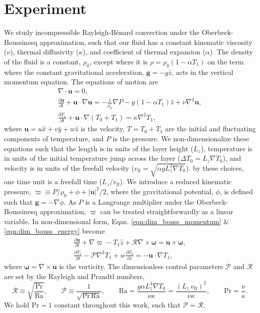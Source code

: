 \documentclass[aps, pre, onecolumn, nofootinbib, notitlepage, groupedaddress, amsfonts, amssymb, amsmath, longbibliography]{revtex4-1}
\newcommand{\DivU}{\ensuremath{\nabla\cdot\bm{u}}}
\newcommand{\grad}{\ensuremath{\nabla}}
\newcommand{\RB}{Rayleigh-B\'{e}nard }
\begin{document}
\section{Experiment}
\label{sec:experiment}
We study incompressible \RB convection under the Oberbeck-Boussinesq approximation,
such that our fluid
has a constant kinematic viscosity ($\nu$), thermal diffusivity ($\kappa$), and coefficient
of thermal expansion ($\alpha$). The density of the fluid is a constant, $\rho_0$,
except where it is $\rho = \rho_0(1  - \alpha T_1)$ on the term where
the constant gravitational acceleration, $\bm{g} = - g\hat{z}$, 
acts in the vertical momentum equation.
The equations of motion are \cite{spiegel&veronis1960}
\begin{gather}
\DivU = 0, 
	\label{eqn:incompressible}
\\
\frac{\partial \bm{u}}{\partial t} + \bm{u}\cdot\grad\bm{u} =
-\frac{1}{\rho_0}\grad P - g( 1 - \alpha T_1)\hat{z} + \nu\grad^2\bm{u}, 
	\label{eqn:dim_bouss_momentum}
\\
\frac{\partial T_1}{\partial t} + \bm{u}\cdot\grad(T_0 + T_1) = \kappa\grad^2 T_1,
	\label{eqn:dim_bouss_energy}
\end{gather}
where $\bm{u} = u\hat{x} + v\hat{y} + w\hat{z}$ is the velocity, 
$T = T_0 + T_1$ are the initial and fluctuating components of temperature, 
and $P$ is the pressure.
We non-dimensionalize these equations such that the
length is in units of the layer height ($L_z$),
temperature is in units of the initial temperature jump across the layer ($\Delta T_0 = L_z \grad T_0$), 
and velocity is in units of the freefall velocity ($v_{\text{ff}} = \sqrt{\alpha g L_z^2 \grad T_0}$).
by these choices, one time unit is a freefall time ($L_z/v_{\text{ff}}$).
We introduce a reduced kinematic pressure,
$\varpi \equiv P / \rho_0 + \phi + |\bm{u}|^2 / 2$, where the gravitational
potential, $\phi$, is defined such that $\bm{g} = -\grad \phi$. As $P$ is a
Langrange multiplier under the Oberbeck-Boussinesq approximation, $\varpi$
can be treated straightforwardly as a linear variable. 
In non-dimensional form, Eqns. \ref{eqn:dim_bouss_momentum} \& \ref{eqn:dim_bouss_energy}
become
\begin{gather}
\frac{\partial \bm{u}}{\partial t} + \grad \varpi - T_1\hat{z} + \mathcal{R}\grad\times\bm{\omega} = \bm{u}\times\bm{\omega},
	\label{eqn:bouss_momentum}
\\
\frac{\partial T_1}{\partial t} - \mathcal{P}\grad^2 T_1 + w \frac{\partial T_0}{\partial z} = - \bm{u}\cdot\grad T_1,
	\label{eqn:bouss_energy}
\end{gather}
where $\bm{\omega} = \grad \times \bm{u}$ is the vorticity.
The dimensionless control parameters $\mathcal{P}$ and $\mathcal{R}$ 
are set by the Rayleigh and Prandtl numbers,
\begin{equation}
\mathcal{R} \equiv \sqrt{\frac{\text{Pr}}{\text{Ra}}}, \qquad \mathcal{P} \equiv \frac{1}{\sqrt{\text{Pr}\,\text{Ra}}}, \qquad
\text{Ra} = \frac{g \alpha L_z^4 \grad T_0}{\nu\kappa} = \frac{(L_z\,v_{\text{ff}})^2}{\nu\kappa}, \qquad \text{Pr} = \frac{\nu}{\kappa}.
\end{equation}
We hold Pr$ = 1$ constant throughout this work, such that $\mathcal{P} = \mathcal{R}$.
\end{document}

